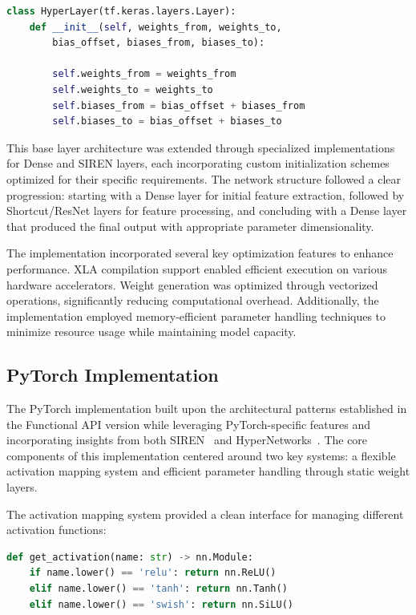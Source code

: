 \documentclass[10pt,journal,compsoc,onecolumn]{IEEEtran}
\begin{document}
\begin{lstlisting}[language=Python, gobble=8]
class HyperLayer(tf.keras.layers.Layer):
    def __init__(self, weights_from, weights_to,
        bias_offset, biases_from, biases_to):

        self.weights_from = weights_from
        self.weights_to = weights_to
        self.biases_from = bias_offset + biases_from
        self.biases_to = bias_offset + biases_to
\end{lstlisting}

This base layer architecture was extended through specialized implementations for Dense and SIREN layers, each incorporating custom initialization schemes optimized for their specific requirements. The network structure followed a clear progression: starting with a Dense layer for initial feature extraction, followed by Shortcut/ResNet layers for feature processing, and concluding with a Dense layer that produced the final output with appropriate parameter dimensionality.

The implementation incorporated several key optimization features to enhance performance. XLA compilation support enabled efficient execution on various hardware accelerators. Weight generation was optimized through vectorized operations, significantly reducing computational overhead. Additionally, the implementation employed memory-efficient parameter handling techniques to minimize resource usage while maintaining model capacity.

\subsection{PyTorch Implementation}
The PyTorch implementation built upon the architectural patterns established in the Functional API version while leveraging PyTorch-specific features and incorporating insights from both SIREN~\cite{siren2020} and HyperNetworks~\cite{hypernetworks2016}. The core components of this implementation centered around two key systems: a flexible activation mapping system and efficient parameter handling through static weight layers.

The activation mapping system provided a clean interface for managing different activation functions:

\begin{lstlisting}[language=Python, gobble=8]
def get_activation(name: str) -> nn.Module:
    if name.lower() == 'relu': return nn.ReLU()
    elif name.lower() == 'tanh': return nn.Tanh()
    elif name.lower() == 'swish': return nn.SiLU()
\end{lstlisting}
\end{document}
